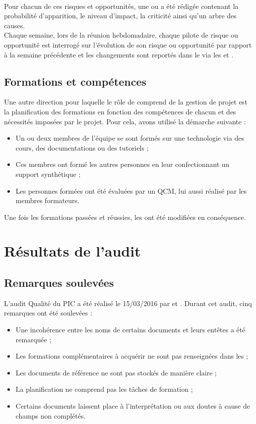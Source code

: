 \documentclass[asi]{picInsa}
\begin{document}
~\\
\indent Pour chacun de ces risques et opportunités, une \FDR{} ou \FDO{} a été rédigée contenant la probabilité d'apparition, le niveau d'impact, la criticité ainsi qu'un arbre des causes. \\
\indent Chaque semaine, lors de la réunion hebdomadaire, chaque pilote de risque ou opportunité est interrogé sur l'évolution de son risque ou opportunité par rapport à la semaine précédente et les changements sont reportés dans le \PRO{} via les \FDR{} et \FDO{}.

\section{Formations et compétences}
Une autre direction pour laquelle le rôle de \RQ{} comprend de la gestion de projet est la planification des formations en fonction des compétences de chacun et des nécessités imposées par le projet. Pour cela, avons utilisé la démarche suivante :
\begin{itemize}
\item Un ou deux membres de l’équipe se sont formés sur une technologie via des cours, des documentations ou des tutoriels ;
\item Ces membres ont formé les autres personnes en leur confectionnant un support synthétique ;
\item Les personnes formées ont été évaluées par un QCM, lui aussi réalisé par les membres formateurs.
\end{itemize}
Une fois les formations passées et réussies, les \FC{} ont été modifiées en conséquence.


\chapter{Résultats de l'audit}
\label{Resultats}

\section{Remarques soulevées}
L’audit Qualité du PIC a été réalisé le 15/03/2016 par \nomApprobateur{} et \nomTuteurQualite. Durant cet audit, cinq remarques ont été soulevées :
\begin{itemize}
\item Une incohérence entre les noms de certains documents et leurs entêtes a été remarquée ;
\item Les formations complémentaires à acquérir ne sont pas renseignées dans les \FC{} ;
\item Les documents de référence ne sont pas stockés de manière claire ;
\item La planification ne comprend pas les tâches de formation ;
\item Certains documents laissent place à l'interprétation ou aux doutes à cause de champs non complétés.
\end{itemize}
\end{document}
